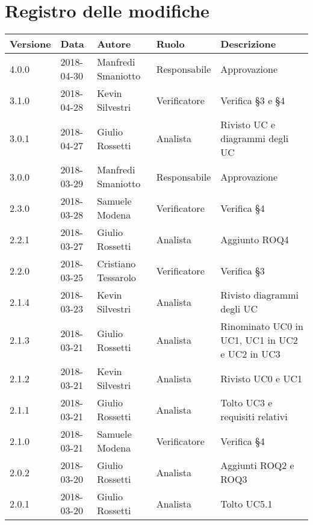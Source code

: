 \documentclass[./AnalisideiRequisiti.tex]{subfiles}
\begin{document}
	
{
	\chapter*{Registro delle modifiche}
\setlength\LTleft{-22mm}
	\begin{longtable}{|p{20mm}|p{20mm}|p{40mm}|p{30mm}|p{50mm}|}
		\hline
		\textbf{Versione} & \textbf{Data} & \textbf{Autore} & \textbf{Ruolo} & \textbf{Descrizione} \\ \hline 
		    
		4.0.0 & 2018-04-30 & Manfredi Smaniotto & Responsabile & Approvazione\\ \hline
		3.1.0 & 2018-04-28 & Kevin Silvestri & Verificatore & Verifica §3 e §4\\ \hline 
		3.0.1 & 2018-04-27 & Giulio Rossetti & Analista & Rivisto UC e diagrammi degli UC\\ \hline
		    
		3.0.0 & 2018-03-29 & Manfredi Smaniotto & Responsabile & Approvazione\\ \hline 
		2.3.0 & 2018-03-28 & Samuele Modena & Verificatore & Verifica §4\\ \hline 		
		2.2.1 & 2018-03-27 & Giulio Rossetti & Analista & Aggiunto ROQ4\\ \hline 
		2.2.0 & 2018-03-25 & Cristiano Tessarolo & Verificatore & Verifica §3\\ \hline 
		2.1.4 & 2018-03-23 & Kevin Silvestri & Analista & Rivisto diagrammi degli UC\\ \hline
		2.1.3 & 2018-03-21 & Giulio Rossetti & Analista & Rinominato UC0 in UC1, UC1 in UC2 e UC2 in UC3\\ \hline
		2.1.2 & 2018-03-21 & Kevin Silvestri & Analista & Rivisto UC0 e UC1\\ \hline
		2.1.1 & 2018-03-21 & Giulio Rossetti & Analista & Tolto UC3 e requisiti relativi\\ \hline
		2.1.0 & 2018-03-21 & Samuele Modena & Verificatore & Verifica §4\\ \hline
		2.0.2 & 2018-03-20 & Giulio Rossetti & Analista & Aggiunti ROQ2 e ROQ3\\ \hline
		2.0.1 & 2018-03-20 & Giulio Rossetti & Analista & Tolto UC5.1\\ \hline
		

\end{longtable}}
\end{document}
